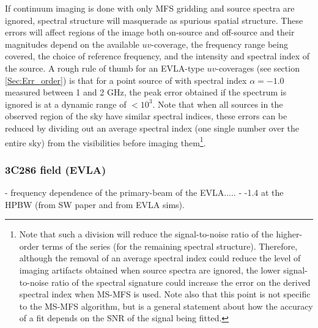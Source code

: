 \documentclass[structabstract]{stylefiles/aa}
\begin{document}
If continuum imaging is done with only MFS gridding and source spectra are ignored,
spectral structure will masquerade as spurious spatial structure. 
These errors will affect regions of the image both on-source and off-source
and their magnitudes depend on the available $uv$-coverage, the frequency range being covered,
the choice of reference frequency, and the intensity and spectral index of the source.
%
A rough rule of thumb for an EVLA-type $uv$-coverages (see section \ref{Sec:Err_order})
is that for a point source
of with spectral index $\alpha=-1.0$ measured between 1 and 2 GHz,
the peak error obtained if the spectrum is ignored is at a dynamic range of $<10^3$. 
Note that when all sources in the observed region of the sky have similar spectral indices, 
these errors can be reduced by dividing out an average spectral index
(one single number over the entire sky) from the visibilities before imaging them\footnote
{Note that such a division will reduce the signal-to-noise ratio of the higher-order
terms of the series (for the remaining spectral structure).
Therefore, although the removal of an average spectral index
could reduce the level of imaging artifacts obtained when source spectra are
ignored, the lower signal-to-noise ratio of the spectral signature 
could increase the error on the derived spectral index when MS-MFS is used. 
Note also that this point is not specific to the MS-MFS algorithm,
but is a general statement about how the accuracy of a fit depends on the SNR of the signal
being fitted.}.


\subsubsection{3C286 field (EVLA)}

\begin{figure}[t!]
\begin{center}
\end{center}
\end{figure}

- frequency dependence of the primary-beam of the EVLA.....
- -1.4 at the HPBW (from SW paper and from EVLA sims). 
\end{document}
